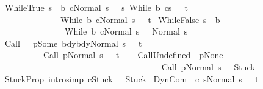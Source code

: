 \begin{isabellebody}
\isanewline
{\isacharbar}\ WhileTrue{\isacharcolon}\ {\isachardoublequoteopen}{\isasymlbrakk}s\ {\isasymin}\ b{\isacharsemicolon}\ {\isasymGamma}{\isasymturnstile}{\isasymlangle}c{\isacharcomma}Normal\ s{\isasymrangle}\ {\isasymRightarrow}\ \ s{\isacharprime}{\isacharsemicolon}\ {\isasymGamma}{\isasymturnstile}{\isasymlangle}While\ b\ c{\isacharcomma}s{\isacharprime}{\isasymrangle}\ {\isasymRightarrow}\ \ t{\isasymrbrakk}\ \isanewline
\ \ \ \ \ \ \ \ \ \ \ \ \ \ {\isasymLongrightarrow}\ \ \isanewline
\ \ \ \ \ \ \ \ \ \ \ \ \ \ {\isasymGamma}{\isasymturnstile}{\isasymlangle}While\ b\ c{\isacharcomma}Normal\ s{\isasymrangle}\ {\isasymRightarrow}\ \ t{\isachardoublequoteclose}\isanewline
\isanewline
{\isacharbar}\ WhileFalse{\isacharcolon}\ {\isachardoublequoteopen}{\isasymlbrakk}s\ {\isasymnotin}\ b{\isasymrbrakk}\ \isanewline
\ \ \ \ \ \ \ \ \ \ \ \ \ \ \ {\isasymLongrightarrow}\ \ \isanewline
\ \ \ \ \ \ \ \ \ \ \ \ \ \ \ {\isasymGamma}{\isasymturnstile}{\isasymlangle}While\ b\ c{\isacharcomma}Normal\ s{\isasymrangle}\ {\isasymRightarrow}\ \ Normal\ s{\isachardoublequoteclose}\isanewline
\isanewline
{\isacharbar}\ Call{\isacharcolon}\ \ {\isachardoublequoteopen}{\isasymlbrakk}{\isasymGamma}\ p{\isacharequal}Some\ bdy{\isacharsemicolon}{\isasymGamma}{\isasymturnstile}{\isasymlangle}bdy{\isacharcomma}Normal\ s{\isasymrangle}\ {\isasymRightarrow}\ \ t{\isasymrbrakk}\ \isanewline
\ \ \ \ \ \ \ \ \ \ {\isasymLongrightarrow}\ \isanewline
\ \ \ \ \ \ \ \ \ \ {\isasymGamma}{\isasymturnstile}{\isasymlangle}Call\ p{\isacharcomma}Normal\ s{\isasymrangle}\ {\isasymRightarrow}\ \ t{\isachardoublequoteclose}\isanewline
\ \ \isanewline
{\isacharbar}\ CallUndefined{\isacharcolon}\ {\isachardoublequoteopen}{\isasymlbrakk}{\isasymGamma}\ p{\isacharequal}None{\isasymrbrakk}\ \isanewline
\ \ \ \ \ \ \ \ \ \ \ \ \ \ \ \ \ \ {\isasymLongrightarrow}\ \isanewline
\ \ \ \ \ \ \ \ \ \ \ \ \ \ \ \ \ \ {\isasymGamma}{\isasymturnstile}{\isasymlangle}Call\ p{\isacharcomma}Normal\ s{\isasymrangle}\ {\isasymRightarrow}\ \ Stuck{\isachardoublequoteclose}\isanewline
\isanewline
{\isacharbar}\ StuckProp\ {\isacharbrackleft}intro{\isacharcomma}simp{\isacharbrackright}{\isacharcolon}\ {\isachardoublequoteopen}{\isasymGamma}{\isasymturnstile}{\isasymlangle}c{\isacharcomma}Stuck{\isasymrangle}\ {\isasymRightarrow}\ \ Stuck{\isachardoublequoteclose}\isanewline
\isanewline
{\isacharbar}\ DynCom{\isacharcolon}\ \ {\isachardoublequoteopen}{\isasymlbrakk}{\isasymGamma}{\isasymturnstile}{\isasymlangle}{\isacharparenleft}c\ s{\isacharparenright}{\isacharcomma}Normal\ s{\isasymrangle}\ {\isasymRightarrow}\ \ t{\isasymrbrakk}\ \isanewline

\end{isabellebody}
